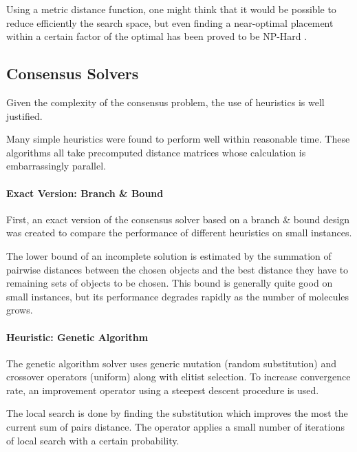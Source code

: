 \documentclass[10pt,letterpaper]{article}
\begin{document}
\noindent Using a metric distance function, one might think that it would be possible to reduce efficiently the search space, but even finding a near-optimal placement within a certain factor of the optimal has been proved to be NP-Hard \cite{compact_location}.



\subsection*{Consensus Solvers}
Given the complexity of the consensus problem, the use of heuristics is well justified.


\noindent Many simple heuristics were found to perform well within reasonable time. These algorithms all take precomputed distance matrices whose calculation is embarrassingly parallel.

\paragraph{Exact Version: Branch \& Bound}
First, an exact version of the consensus solver based on a branch \& bound design was created to compare the performance of different heuristics on small instances.

\noindent The lower bound of an incomplete solution is estimated by the summation of pairwise distances between the chosen objects and the best distance they have to remaining sets of objects to be chosen. This bound is generally quite good on small instances, but its performance degrades rapidly as the number of molecules grows.

\paragraph{Heuristic: Genetic Algorithm}
The genetic algorithm solver uses generic mutation (random substitution) and crossover operators (uniform) along with elitist selection. To increase convergence rate, an improvement operator using a steepest descent procedure is used.

\noindent The local search is done by finding the substitution which improves the most the current sum of pairs distance. The operator applies a small number of iterations of local search with a certain probability.
\end{document}
